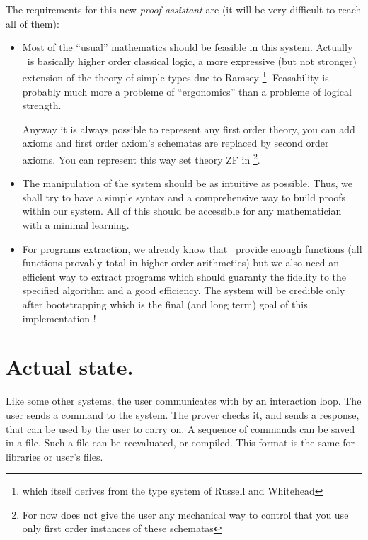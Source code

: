 The requirements for this new {\em proof assistant} are (it will be very
difficult to reach all of them):
\begin{itemize}
\item Most of the ``usual'' mathematics should be feasible in this
  system. Actually \AFD\ is basically higher order classical logic, a
  more expressive (but not stronger) extension of the theory of simple
  types due to Ramsey \cite{Ra25}\footnote{which itself derives from the
    type system of Russell and Whitehead}. Feasability is probably much
  more a probleme of ``ergonomics'' than a probleme of logical strength.
  
  Anyway it is always possible to represent any first order theory, you
  can add axioms and first order axiom's schematas are replaced by
  second order axioms. You can represent this way set theory ZF in
  \AFD\footnote{For now \AFD{} does not give the user any mechanical way to
    control that you use only first order instances of these schematas}.
  

\item The manipulation of the system should be as intuitive as possible. Thus,
we shall try to have a simple syntax and a comprehensive way to build proofs
within our system. All of this should be accessible for any mathematician with
a minimal learning.

\item For programs extraction, we already know that \AFD\ provide enough
  functions (all functions provably total in higher order arithmetics) but we
  also need an efficient way to extract programs which should guaranty the
  fidelity to the specified algorithm and a good efficiency. The system will
  be credible only after bootstrapping which is the final (and long term) goal
  of this implementation !

\end{itemize}


\section{Actual state.}

Like some other systems, the user communicates with \AFD{} by an
interaction loop. The user sends a command to the system. The prover
checks it, and sends a response, that can be used by the user to carry
on. A sequence of commands can be saved in a file. Such a file can be
reevaluated, or compiled. This format is the same for libraries or
user's files.

